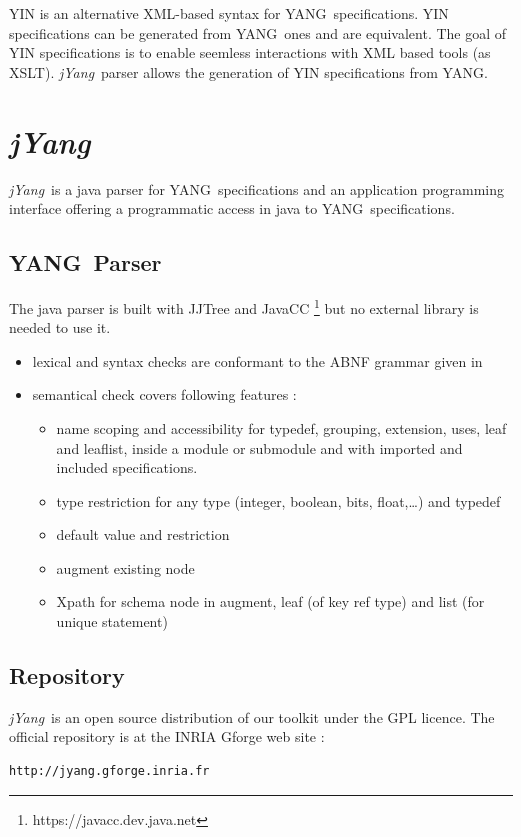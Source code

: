 \documentclass[a4paper]{article}
\newcommand{\jyang}{{\sl jYang}}
\newcommand{\y}{YANG}
\begin{document}
YIN  is an alternative  XML-based syntax  for \y\  specifications. YIN
specifications can be generated from  \y\ ones and are equivalent. The
goal of YIN specifications is to enable seemless interactions with XML
based tools  (as XSLT).  \jyang\  parser allows the generation  of YIN
specifications from \y.

\section{\jyang}

\jyang\ is  a java  parser for \y\  specifications and  an application
programming interface  offering a programmatic  access in java  to \y\
specifications.

\subsection{\y\ Parser}

The    java    parser    is    built   with    JJTree    and    JavaCC
\footnote{https://javacc.dev.java.net}  but  no  external  library  is
needed to use it.

\begin{itemize}
\item
lexical and syntax  checks are conformant to the  ABNF grammar given in
\cite{yang01}
\item
semantical check covers following features :
\begin{itemize}
\item
name scoping and accessibility for typedef, grouping, extension, uses,
leaf and  leaflist, inside  a module  or submodule  and with  imported and
included specifications.
\item
type restriction  for any type (integer,  boolean, bits, float,\ldots)
and typedef
\item
default value and restriction
\item
augment existing node
\item
Xpath for schema node in augment, leaf (of key ref type) and list (for
unique statement)
\end{itemize}
\end{itemize}

\subsection{Repository}

\jyang\ is  an open source distribution  of our toolkit  under the GPL
licence. The official repository is at the INRIA Gforge web site :\\
\begin{verbatim}
http://jyang.gforge.inria.fr
\end{verbatim}
\end{document}
